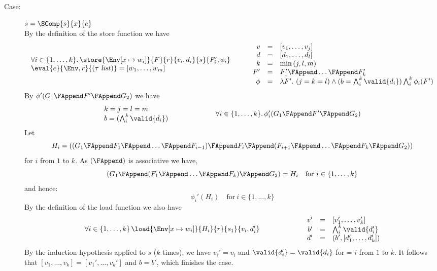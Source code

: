 {\begin{description}
\item[Case:] $s = \SComp{s}{x}{e}$\\[1ex]
By the definition of the store function we have
\[
\begin{array}{l}
\forall i \in \{1,\dots,k\}.\,\store{\Env[x \mapsto w_i]}{F}{r}{v_i,d_i}{s}{F_i',\phi_i}\\
\eval{e}{\Env,r}{(\tau\ \mathit{list})} = [w_1,\dots,w_m ]\\
\end{array}\hspace*{.75cm}\begin{array}{rcl}
v &=& [v_1,\dots,v_j]\\
d &=& [d_1,\dots,d_l]\\
k &=& \min{(j,l,m)}\\
F' &=& F_1' \FAppend \dots \FAppend F_k'\\
\phi &=& \lambda F'.~(j = k = l) \wedge (b = \bigwedge_i^k \valid{d_i}) \bigwedge_i^k \phi_i(F')\\
\end{array}
\]
By $\phi'(G_1 \FAppend F' \FAppend G_2)$ we have
\[
\begin{array}{l}
k = j = l = m\\
b = (\bigwedge_i^k \valid{d_i})\\
\end{array}\hspace*{2cm}\begin{array}{l}
\forall i \in \{1,\dots,k\}.\,\phi_i'(G_1 \FAppend F' \FAppend G_2) \\
\end{array}
\]
%
Let
\[
H_i = ((G_1\FAppend F_1\FAppend \dots \FAppend F_{i-1}) \FAppend F_i \FAppend (F_{i+1} \FAppend \dots \FAppend F_k \FAppend G_2))
\]
for $i$ from $1$ to $k$. As $(\FAppend)$ is associative we have,
\[
(G_1\FAppend (F_1\FAppend \dots \FAppend F_k)\FAppend G_2) = H_i \quad \text{for}~i \in \{1,\dots,k\}
\]
and hence:
\[
\phi_i'(H_i) \quad \text{for}~i \in \{1,\dots,k\}
\]
%
By the definition of the load function we also have 
\[ 
\begin{array}{l}
\forall i \in \{1,\dots,k\}\,\load{\Env[ x \mapsto w_i]}{H_i}{r}{s_1}{v_i,d_i'}\\
\end{array}\hspace*{2cm}\begin{array}{rcl}
v' &=& [v_1',\dots,v_k']\\
b' &=& \bigwedge_i^k \valid{d_i'}\\
d' &=& (b',[d_1',\dots,d_k'])\\
\end{array}
\]
%
By the induction hypothesis applied to $s$ ($k$ times), we have $v_i'
= v_i$ and $\valid{d_i'} = \valid{d_i}$ for = $i$ from $1$ to
$k$. It follows that $[v_1,\dots,v_k] = [v_1',\dots,v_k']$ and $b =
b'$, which finishes the case.


\end{description}}
